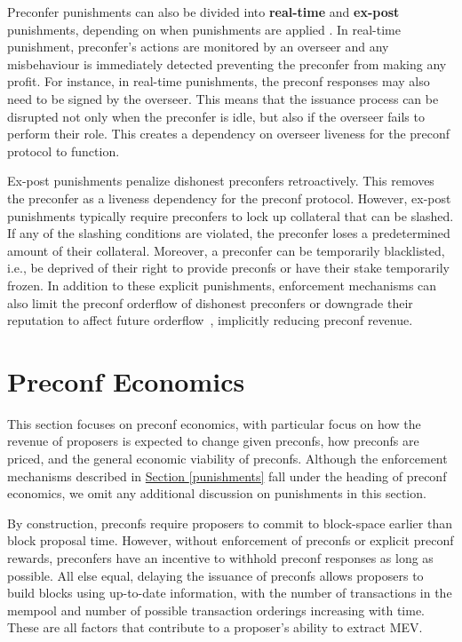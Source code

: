 \documentclass[a4paper]{article}
\theoremstyle{boldstyle}
\begin{document}
    Preconfer punishments can also be divided into \textbf{real-time} and \textbf{ex-post} punishments, depending on when punishments are applied \cite{W:PreconfirmationFairExchange}. In real-time punishment, preconfer's actions are monitored by an overseer and any misbehaviour is immediately detected preventing the preconfer from making any profit. For instance, in real-time punishments, the preconf responses may also need to be signed by the overseer. This means that the issuance process can be disrupted not only when the preconfer is idle, but also if the overseer fails to perform their role. This creates a dependency on overseer liveness for the preconf protocol to function.
    
    Ex-post punishments penalize dishonest preconfers retroactively. This removes the preconfer as a liveness dependency for the preconf protocol. However, ex-post punishments typically require preconfers to lock up collateral that can be slashed. If any of the slashing conditions are violated, the preconfer loses a predetermined amount of their collateral. Moreover, a preconfer can be temporarily blacklisted, i.e., be deprived of their right to provide preconfs or have their stake temporarily frozen. In addition to these explicit punishments, enforcement mechanisms can also limit the preconf orderflow of dishonest preconfers or downgrade their reputation to affect future orderflow~\cite{W:PreconfirmationFairExchange,W:User-DefinedPenalties:EnsuringHonestPreconfBehavior}, implicitly reducing preconf revenue.


\section{Preconf Economics}
\label{preconf_economics}

This section focuses on preconf economics, with particular focus on how the revenue of proposers is expected to change given preconfs, how preconfs are priced, and the general economic viability of preconfs. Although the enforcement mechanisms described in \hyperref[punishments]{Section \ref{punishments}} fall under the heading of preconf economics, we omit any additional discussion on punishments in this section. 

By construction, preconfs require proposers to commit to block-space earlier than block proposal time. However, without enforcement of preconfs or explicit preconf rewards, preconfers have an incentive to withhold preconf responses as long as possible. All else equal, delaying the issuance of preconfs allows proposers to build blocks using up-to-date information, with the number of transactions in the mempool and number of possible transaction orderings increasing with time. These are all factors that contribute to a proposer's ability to extract MEV. 
\end{document}
